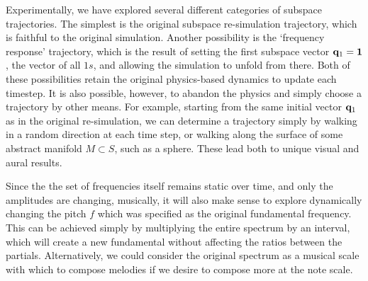 \documentclass[11pt]{article}
\begin{document}
Experimentally, we have explored several different categories of subspace trajectories. The simplest is the original subspace re-simulation trajectory, which is faithful to the original simulation. Another possibility is the `frequency response' trajectory, which is the result of setting the first subspace vector $\mathbf{q}_1 = \mathbf{1}$, the vector of all $1s$, and allowing the simulation to unfold from there. Both of these possibilities retain the original physics-based dynamics to update each timestep. It is also possible, however, to abandon the physics and simply choose a trajectory by other means. For example, starting from the same initial vector $\mathbf{q}_1$ as in the original re-simulation, we can determine a trajectory simply by walking in a random direction at each time step, or walking along the surface of some abstract manifold $M \subset S$, such as a sphere. These lead both to unique visual and aural results. 

Since the the set of frequencies itself remains static over time, and only the amplitudes are changing, musically, it will also make sense to explore dynamically changing the pitch $f$ which was specified as the original fundamental frequency. This can be achieved simply by multiplying the entire spectrum by an interval, which will create a new fundamental without affecting the ratios between the partials. Alternatively, we could consider the original spectrum as a musical scale with which to compose melodies if we desire to compose more at the note scale.







\fontsize{10}{12}

\end{document}
